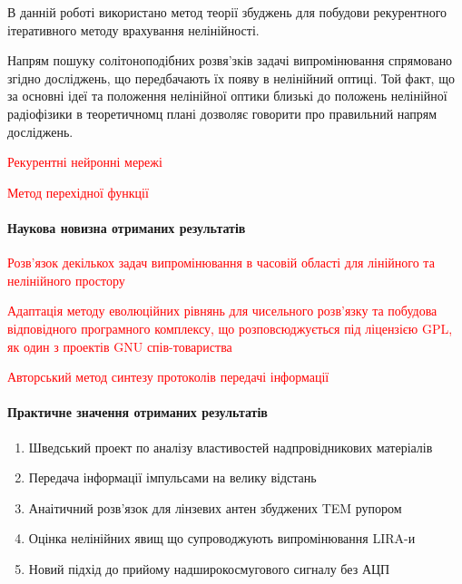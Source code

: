 В данній роботі використано метод теорії збуджень для побудови рекурентного
ітеративного методу врахування нелінійності.

Напрям пошуку солітоноподібних розвя'зків задачі випромінювання спрямовано 
згідно досліджень, що передбачають їх появу в нелінійний оптиці. Той факт,
що за основні ідеї та положення нелінійної оптики близькі до положень 
нелінійної радіофізики в теоретичномц плані дозволяє говорити про правильний 
напрям досліджень.

\textcolor{red}{Рекурентні нейронні мережі}

\textcolor{red}{Метод перехідної функції}

\paragraph{Наукова новизна отриманих результатів}

\textcolor{red}{Розв'язок декількох задач випромінювання в часовій області для 
лінійного та нелінійного простору}

\textcolor{red}{Адаптація методу еволюційних рівнянь для чисельного розв'язку
та побудова відповідного програмного комплексу, що розповсюджується під 
ліцензією GPL, як один з проектів GNU спів-товариства}

\textcolor{red}{Авторський метод синтезу протоколів передачі інформації}

\paragraph{Практичне значення отриманих результатів}

\begin{enumerate} 
	\item Шведський проект по аналізу властивостей надпровідникових матеріалів
	\item Передача інформації імпульсами на велику відстань
	\item Анаітичний розв'язок для лінзевих антен збуджених TEM рупором
	\item Оцінка нелінійних явищ що супроводжують випромінювання LIRA-и
	\item Новий підхід до прийому надширокосмугового сигналу без АЦП
\end{enumerate} 

